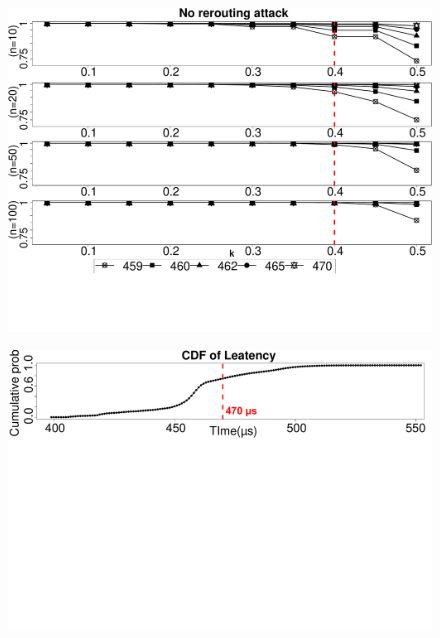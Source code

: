 \ifusenix
\begin{figure}[t]
  \centering
    \includegraphics[trim={0 5cm 0 0}, clip, width=\linewidth]{data/graph/timeRound_new.pdf}
    \caption{\timeRoundCaption}
    \label{graph:diffTh}
\end{figure}

\begin{figure}[t]
  \centering
    \includegraphics[trim={0 16cm 0 0}, clip, width=\linewidth]{data/graph/CDF_Latency_new.pdf}
    \caption{\cumulativeCaption}
    \vspace{-10px}
    \label{fig:cdf}
\end{figure}

